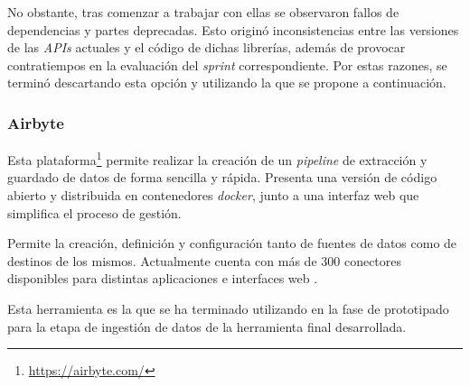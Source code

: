 No obstante, tras comenzar a trabajar con ellas se observaron fallos de dependencias y partes deprecadas. Esto originó inconsistencias entre las versiones de las \textit{APIs} actuales y el código de dichas librerías, además de provocar contratiempos en la evaluación del \textit{sprint} correspondiente. Por estas razones, se terminó descartando esta opción y utilizando la que se propone a continuación. 

\subsubsection{Airbyte}

Esta plataforma\footnote{\url{https://airbyte.com/}} permite realizar la creación de un \textit{pipeline} de extracción y guardado de datos de forma sencilla y rápida. Presenta una versión de código abierto y distribuida en contenedores \textit{docker}, junto a una interfaz web que simplifica el proceso de gestión.

Permite la creación, definición y configuración tanto de fuentes de datos como de destinos de los mismos. Actualmente cuenta con más de 300 conectores disponibles para distintas aplicaciones e interfaces web \cite{airbyteConnectors}.

Esta herramienta es la que se ha terminado utilizando en la fase de prototipado para la etapa de ingestión de datos de la herramienta final desarrollada.